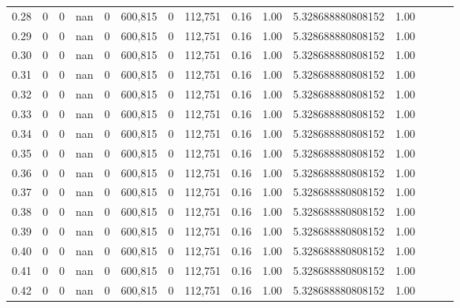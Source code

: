\begin{tabular}{rrrrrrrrrrrrrrr}
0.28 &        0 &       0 &   nan &        0 &  600,815 &        0 &  112,751 &  0.16 &  1.00 &       5.328688880808152 &      1.00 \\
0.29 &        0 &       0 &   nan &        0 &  600,815 &        0 &  112,751 &  0.16 &  1.00 &       5.328688880808152 &      1.00 \\
0.30 &        0 &       0 &   nan &        0 &  600,815 &        0 &  112,751 &  0.16 &  1.00 &       5.328688880808152 &      1.00 \\
0.31 &        0 &       0 &   nan &        0 &  600,815 &        0 &  112,751 &  0.16 &  1.00 &       5.328688880808152 &      1.00 \\
0.32 &        0 &       0 &   nan &        0 &  600,815 &        0 &  112,751 &  0.16 &  1.00 &       5.328688880808152 &      1.00 \\
0.33 &        0 &       0 &   nan &        0 &  600,815 &        0 &  112,751 &  0.16 &  1.00 &       5.328688880808152 &      1.00 \\
0.34 &        0 &       0 &   nan &        0 &  600,815 &        0 &  112,751 &  0.16 &  1.00 &       5.328688880808152 &      1.00 \\
0.35 &        0 &       0 &   nan &        0 &  600,815 &        0 &  112,751 &  0.16 &  1.00 &       5.328688880808152 &      1.00 \\
0.36 &        0 &       0 &   nan &        0 &  600,815 &        0 &  112,751 &  0.16 &  1.00 &       5.328688880808152 &      1.00 \\
0.37 &        0 &       0 &   nan &        0 &  600,815 &        0 &  112,751 &  0.16 &  1.00 &       5.328688880808152 &      1.00 \\
0.38 &        0 &       0 &   nan &        0 &  600,815 &        0 &  112,751 &  0.16 &  1.00 &       5.328688880808152 &      1.00 \\
0.39 &        0 &       0 &   nan &        0 &  600,815 &        0 &  112,751 &  0.16 &  1.00 &       5.328688880808152 &      1.00 \\
0.40 &        0 &       0 &   nan &        0 &  600,815 &        0 &  112,751 &  0.16 &  1.00 &       5.328688880808152 &      1.00 \\
0.41 &        0 &       0 &   nan &        0 &  600,815 &        0 &  112,751 &  0.16 &  1.00 &       5.328688880808152 &      1.00 \\
0.42 &        0 &       0 &   nan &        0 &  600,815 &        0 &  112,751 &  0.16 &  1.00 &       5.328688880808152 &      1.00 \\

\end{tabular}
